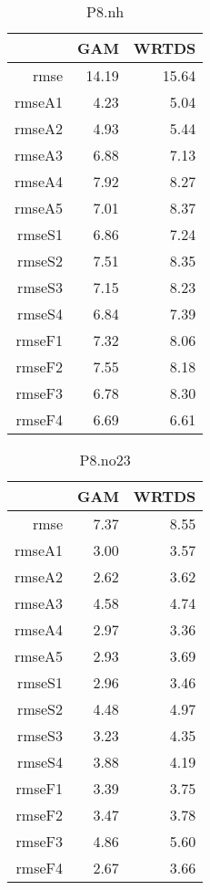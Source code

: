\documentclass[12pt]{amsart}
\begin{document}
\begin{table}[H]
\centering
\begin{tabular}{rrr}
  \hline
 & GAM & WRTDS \\ 
  \hline
rmse & 14.19 & 15.64 \\ 
  rmseA1 & 4.23 & 5.04 \\ 
  rmseA2 & 4.93 & 5.44 \\ 
  rmseA3 & 6.88 & 7.13 \\ 
  rmseA4 & 7.92 & 8.27 \\ 
  rmseA5 & 7.01 & 8.37 \\ 
  rmseS1 & 6.86 & 7.24 \\ 
  rmseS2 & 7.51 & 8.35 \\ 
  rmseS3 & 7.15 & 8.23 \\ 
  rmseS4 & 6.84 & 7.39 \\ 
  rmseF1 & 7.32 & 8.06 \\ 
  rmseF2 & 7.55 & 8.18 \\ 
  rmseF3 & 6.78 & 8.30 \\ 
  rmseF4 & 6.69 & 6.61 \\ 
   \hline
\end{tabular}
\caption{P8.nh}
\end{table}

\begin{table}[H]
\centering
\begin{tabular}{rrr}
  \hline
 & GAM & WRTDS \\ 
  \hline
rmse & 7.37 & 8.55 \\ 
  rmseA1 & 3.00 & 3.57 \\ 
  rmseA2 & 2.62 & 3.62 \\ 
  rmseA3 & 4.58 & 4.74 \\ 
  rmseA4 & 2.97 & 3.36 \\ 
  rmseA5 & 2.93 & 3.69 \\ 
  rmseS1 & 2.96 & 3.46 \\ 
  rmseS2 & 4.48 & 4.97 \\ 
  rmseS3 & 3.23 & 4.35 \\ 
  rmseS4 & 3.88 & 4.19 \\ 
  rmseF1 & 3.39 & 3.75 \\ 
  rmseF2 & 3.47 & 3.78 \\ 
  rmseF3 & 4.86 & 5.60 \\ 
  rmseF4 & 2.67 & 3.66 \\ 
   \hline
\end{tabular}
\caption{P8.no23}
\end{table}
\end{document}
